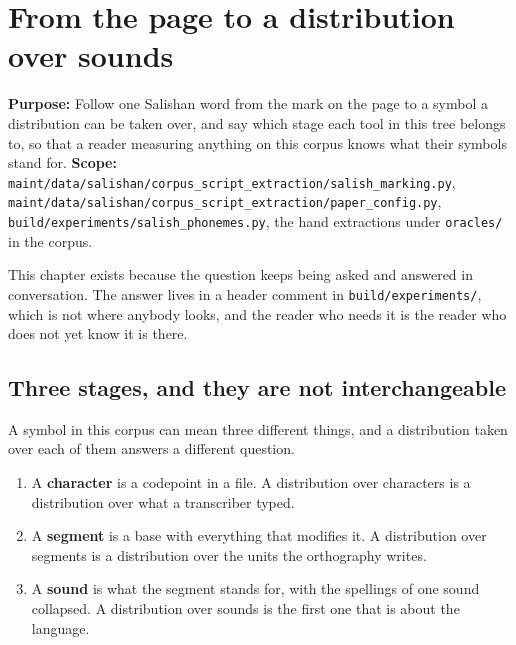 \chapter{From the page to a distribution over sounds}

\textbf{Purpose:} Follow one Salishan word from the mark on the page to a symbol a distribution can
be taken over, and say which stage each tool in this tree belongs to, so that a reader measuring
anything on this corpus knows what their symbols stand for.
\textbf{Scope:}
\texttt{maint/\allowbreak{}data/\allowbreak{}salishan/\allowbreak{}corpus\_\allowbreak{}script\_\allowbreak{}extraction/\allowbreak{}salish\_\allowbreak{}marking.\allowbreak{}py},
\texttt{maint/\allowbreak{}data/\allowbreak{}salishan/\allowbreak{}corpus\_\allowbreak{}script\_\allowbreak{}extraction/\allowbreak{}paper\_\allowbreak{}config.\allowbreak{}py},
\texttt{build/\allowbreak{}experiments/\allowbreak{}salish\_\allowbreak{}phonemes.\allowbreak{}py},
the hand extractions under \texttt{oracles/\allowbreak{}} in the corpus.

This chapter exists because the question keeps being asked and answered in conversation. The answer
lives in a header comment in \texttt{build/\allowbreak{}experiments/\allowbreak{}}, which is not
where anybody looks, and the reader who needs it is the reader who does not yet know it is there.

\section{Three stages, and they are not interchangeable}

A symbol in this corpus can mean three different things, and a distribution taken over each of them
answers a different question.

\begin{enumerate}
  \item A \textbf{character} is a codepoint in a file. A distribution over characters is a
        distribution over what a transcriber typed.
  \item A \textbf{segment} is a base with everything that modifies it. A distribution over segments
        is a distribution over the units the orthography writes.
  \item A \textbf{sound} is what the segment stands for, with the spellings of one sound collapsed.
        A distribution over sounds is the first one that is about the language.
\end{enumerate}

